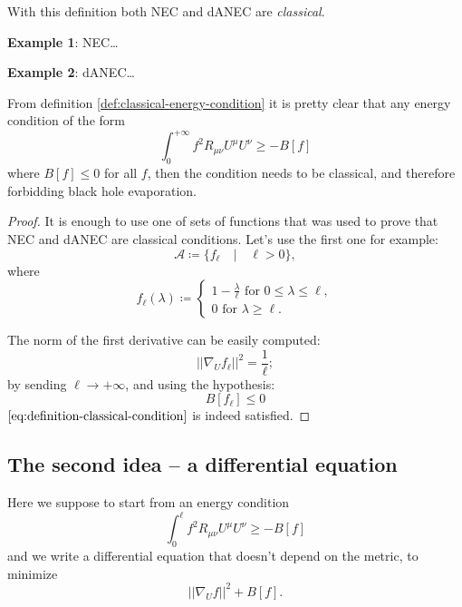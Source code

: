	With this definition both NEC and dANEC are \emph{classical}.

	\textbf{Example 1}: NEC\dots

	\textbf{Example 2}: dANEC\dots

	\begin{corollary}
		From definition \ref{def:classical-energy-condition} it is pretty clear that any energy condition of the form
		\[
			\int_0^{+\infty} f^2 R_{\mu\nu}U^{\mu}U^{\nu} \ge -B[f]	
		\]
		where \(B[f] \le 0\) for all \(f\), then the condition needs to be classical, and therefore forbidding black hole evaporation.
	\end{corollary}
	\begin{proof}
		It is enough to use one of sets of functions that was used to prove that NEC and dANEC are classical conditions. Let's use the first one for example:
		\[
		\mathcal{A} \coloneqq \{f_{\ell} \quad\vert\quad \ell >0\},
		\]
		where
		\[
			f_{\ell}(\lambda) \coloneqq
			\begin{cases}
				 1 - \frac{\lambda}{\ell} \text{ for } 0 \le \lambda \le \ell, \\	
				0 \text{ for } \lambda \ge \ell.
			\end{cases}
		\]

		The norm of the first derivative can be easily computed:
		\[
			\vert \vert \nabla_U f_{\ell} \vert\vert^2 	= \frac{1}{\ell};
		\]
		by sending \(\ell \rightarrow +\infty\), and using the hypothesis:
		\[
			B[f_{\ell}] \le 0	
		\]
		\(\eqref{eq:definition-classical-condition}\) is indeed satisfied.
	\end{proof}
	
	\subsection{The second idea -- a differential equation}
	Here we suppose to start from an energy condition
	\[
		\int_0^{\ell} f^2 R_{\mu\nu}U^{\mu}U^{\nu} \ge -B[f]
	\]
	and we write a differential equation that doesn't depend on the metric, to minimize 
	\[
	\vert\vert \nabla_U f\vert\vert^2 + B[f].	
	\]
	
	

